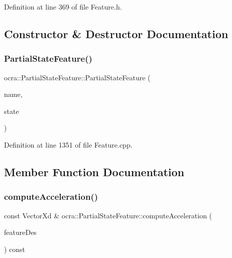 Definition at line 369 of file Feature.\+h.



\subsection{Constructor \& Destructor Documentation}
\hypertarget{classocra_1_1PartialStateFeature_a07a8b02519ae7a77580f8e2deefc86dd}{}\label{classocra_1_1PartialStateFeature_a07a8b02519ae7a77580f8e2deefc86dd} 
\subsubsection{\texorpdfstring{Partial\+State\+Feature()}{PartialStateFeature()}}
{\footnotesize\ttfamily ocra\+::\+Partial\+State\+Feature\+::\+Partial\+State\+Feature (\begin{DoxyParamCaption}\item[{const std\+::string \&}]{name,  }\item[{Partial\+State\+::\+Ptr}]{state }\end{DoxyParamCaption})}



Definition at line 1351 of file Feature.\+cpp.



\subsection{Member Function Documentation}
\hypertarget{classocra_1_1PartialStateFeature_a42af1ac22fc5d9832e134f507a77bfad}{}\label{classocra_1_1PartialStateFeature_a42af1ac22fc5d9832e134f507a77bfad} 
\subsubsection{\texorpdfstring{compute\+Acceleration()}{computeAcceleration()}\hspace{0.1cm}{\footnotesize\ttfamily [1/2]}}
{\footnotesize\ttfamily const Vector\+Xd \& ocra\+::\+Partial\+State\+Feature\+::compute\+Acceleration (\begin{DoxyParamCaption}\item[{const \hyperlink{classocra_1_1Feature}{Feature} \&}]{feature\+Des }\end{DoxyParamCaption}) const\hspace{0.3cm}{\ttfamily [virtual]}}



